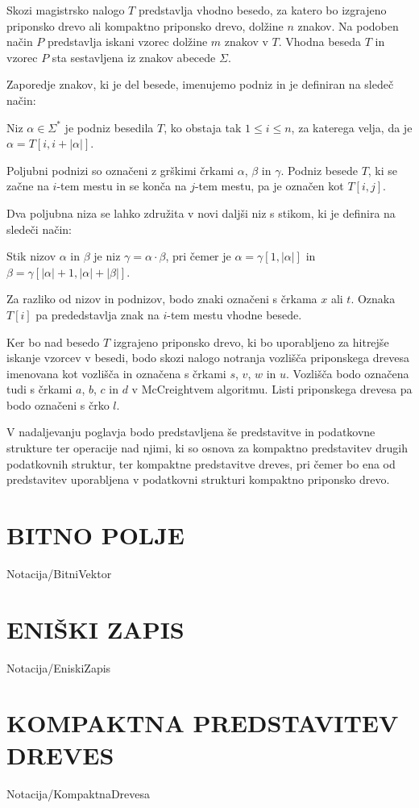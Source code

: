 Skozi magistrsko nalogo $T$ predstavlja vhodno besedo, za katero bo izgrajeno priponsko drevo ali kompaktno priponsko drevo, dolžine $n$ znakov. Na podoben način $P$ predstavlja iskani vzorec dolžine $m$ znakov v $T$. Vhodna beseda $T$ in vzorec $P$ sta sestavljena iz znakov abecede $\Sigma$.

Zaporedje znakov, ki je del besede, imenujemo podniz in je definiran na sledeč način:
\begin{defi}
    Niz $\alpha\in\Sigma^*$ je podniz besedila $T$, ko obstaja tak $1\le i\le n$, za katerega velja, da je  $\alpha=T[i,i+|\alpha|]$. 
\end{defi}
Poljubni podnizi so označeni z grškimi črkami $\alpha$, $\beta$ in $\gamma$. Podniz besede $T$, ki se začne na $i$-tem mestu in se konča na $j$-tem mestu, pa je označen kot $T[i,j]$.

Dva poljubna niza se lahko združita v novi daljši niz s stikom, ki je definira na sledeči način:
\begin{defi}
    Stik nizov $\alpha$ in $\beta$ je niz $\gamma=\alpha\cdot\beta$, pri čemer je $\alpha=\gamma[1,|\alpha|]$ in $\beta=\gamma[|\alpha|+1,|\alpha|+|\beta|]$.
\end{defi}

Za razliko od nizov in podnizov, bodo znaki označeni s črkama $x$ ali $t$. Oznaka $T[i]$ pa prededstavlja znak na $i$-tem mestu vhodne besede.

Ker bo nad besedo $T$ izgrajeno priponsko drevo, ki bo uporabljeno za hitrejše iskanje vzorcev v besedi, bodo skozi nalogo notranja vozlišča priponskega drevesa imenovana kot vozlišča in označena s črkami $s$, $v$, $w$ in $u$. Vozlišča bodo označena tudi s črkami $a$, $b$, $c$ in $d$ v McCreightvem algoritmu. Listi priponskega drevesa pa bodo označeni s črko $l$.

V nadaljevanju poglavja bodo predstavljena še predstavitve in podatkovne strukture ter operacije nad njimi, ki so osnova za kompaktno predstavitev drugih podatkovnih struktur, ter kompaktne predstavitve dreves, pri čemer bo ena od predstavitev uporabljena v podatkovni strukturi kompaktno priponsko drevo.

\section{BITNO POLJE}\label{sec:Bitno_Polje}
{Notacija/BitniVektor}

\section{ENIŠKI ZAPIS}\label{sec:Eniski_Zapis}
{Notacija/EniskiZapis}

\section{KOMPAKTNA PREDSTAVITEV DREVES}\label{sec:kompaktna_drevesa}
{Notacija/KompaktnaDrevesa}